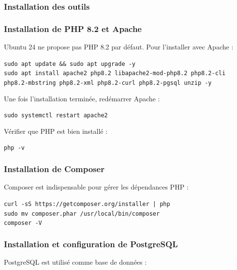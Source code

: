 \subsubsection{Installation des outils}

\subsubsection*{Installation de PHP 8.2 et Apache}
Ubuntu 24 ne propose pas PHP 8.2 par défaut. Pour l’installer avec Apache :
\begin{tcolorbox}[colback=black, coltext=white, title=Installation de PHP 8.2 et Apache, fonttitle=\bfseries]
\texttt{sudo apt update \&\& sudo apt upgrade -y} \\
\texttt{sudo apt install apache2 php8.2 libapache2-mod-php8.2 php8.2-cli php8.2-mbstring php8.2-xml php8.2-curl php8.2-pgsql unzip -y}
\end{tcolorbox}

Une fois l’installation terminée, redémarrer Apache :

\begin{tcolorbox}[colback=black, coltext=white, title=Redémarrage du serveur Apache, fonttitle=\bfseries]
\texttt{sudo systemctl restart apache2}
\end{tcolorbox}

Vérifier que PHP est bien installé :

\begin{tcolorbox}[colback=black, coltext=white, title=Vérification de la version de PHP, fonttitle=\bfseries]
\texttt{php -v}
\end{tcolorbox}

\subsubsection*{Installation de Composer}
Composer est indispensable pour gérer les dépendances PHP :

\begin{tcolorbox}[colback=black, coltext=white, title=Installation de Composer, fonttitle=\bfseries]
\texttt{curl -sS https://getcomposer.org/installer | php} \\
\texttt{sudo mv composer.phar /usr/local/bin/composer} \\
\texttt{composer -V}
\end{tcolorbox}

\subsubsection{Installation et configuration de PostgreSQL}
PostgreSQL est utilisé comme base de données :

